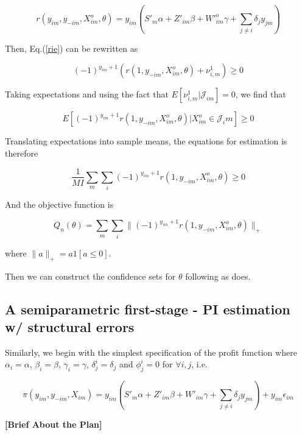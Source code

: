 \documentclass[a4paper]{article}
\begin{document}
$$r(y_{im},y_{-im},X^o_{im}, \theta) = y_{im}(S'_m\alpha+Z'_{im}\beta + W'^o_{im}\gamma + \sum_{j\neq i}\delta_j y_{jm})$$



Then, Eq.(\ref{rie}) can be rewritten as 

\begin{equation}
 (-1)^{y_{im}+1}(r(1,y_{-im},X^o_{im},\theta)+ \nu^1_{i,m} )\geq 0
\label{rie_PI}
\end{equation}

Taking expectations and using the fact that $E[\nu^1_{i,m}|\mathcal{J}_{im}] = 0$, we find that 


\begin{equation}
 E[(-1)^{y_{im}+1}r(1,y_{-im},X^o_{im},\theta)|X^o_{im} \in \mathcal{J}_im]\geq 0
\label{rie_PI_exp}
\end{equation}

Translating expectations into sample means, the equations for estimation is therefore

\begin{equation}
\dfrac{1}{MI}\sum_m\sum_i(-1)^{y_{im}+1}r(1,y_{-im},X^o_{im},\theta) \geq 0
\end{equation}

And the objective function is 

$$Q_n(\theta) = \sum_m\sum_i\|(-1)^{y_{im}+1}r(1,y_{-im},X^o_{im},\theta) \|_+$$

where $\|a\|_+ = a1[a \leq 0].$

Then we can construct the confidence sets for $\theta$ following \cite{chernozhukov2007estimation} as \cite{ciliberto2009market} does.

\subsection*{A semiparametric first-stage - PI estimation w/ structural errors}


Similarly, we begin with the simplest specification of the profit function where $\alpha_i=\alpha$, $\beta_i=\beta$, $\gamma_i=\gamma$, $\delta_j^i=\delta_j$ and $\phi_j^i=0$ for $\forall i,j$, i.e.

\begin{equation}
\pi(y_{im},y_{-im},X_{im})=y_{im}(S'_m\alpha+Z'_{im}\beta+W'_{im}\gamma+\sum_{j\neq i}\delta_{j} y_{jm})+y_{im}\epsilon_{im} 
\end{equation}



\textbf{[Brief About the Plan]}
\end{document}
